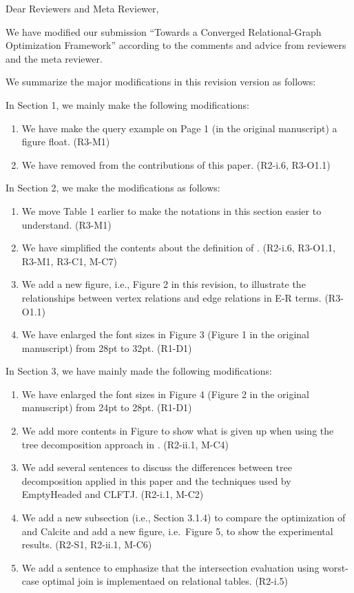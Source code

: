 \documentclass{article}
\begin{document}
Dear Reviewers and Meta Reviewer,
\bigskip %


We have modified our submission ``Towards a Converged Relational-Graph Optimization Framework'' according to the comments and advice from reviewers and the meta reviewer.

We summarize the major modifications in this revision version as follows:


In Section 1, we mainly make the following modifications:
\begin{enumerate}
	\item We have make the query example on Page 1 (in the original manuscript) a figure float. (R3-M1)
	\item We have removed \rgmapping from the contributions of this paper. (R2-i.6, R3-O1.1)
\end{enumerate}

In Section 2, we make the modifications as follows:
\begin{enumerate}
	\item We move Table 1 earlier to make the notations in this section easier to understand. (R3-M1)
	\item We have simplified the contents about the definition of \rgmapping. (R2-i.6, R3-O1.1, R3-M1, R3-C1, M-C7)
	\item We add a new figure, i.e., Figure 2 in this revision, to illustrate the relationships between vertex relations and edge relations in E-R terms. (R3-O1.1)
	\item We have enlarged the font sizes in Figure 3 (Figure 1 in the original manuscript) from 28pt to 32pt. (R1-D1)
\end{enumerate}

In Section 3, we have mainly made the following modifications:
\begin{enumerate}
	\item We have enlarged the font sizes in Figure 4 (Figure 2 in the original manuscript) from 24pt to 28pt. (R1-D1)
	\item We add more contents in Figure to show what is given up when using the tree decomposition approach in \name. (R2-ii.1, M-C4)
	\item We add several sentences to discuss the differences between tree decomposition applied in this paper and the techniques used by EmptyHeaded and CLFTJ. (R2-i.1, M-C2)
	\item We add a new subsection (i.e., Section 3.1.4) to compare the optimization of \name and Calcite and add a new figure, i.e.~Figure 5, to show the experimental results. (R2-S1, R2-ii.1, M-C6)
	\item We add a sentence to emphasize that the intersection evaluation using worst-case optimal join is implementaed on relational tables. (R2-i.5)
\end{enumerate}
\end{document}
